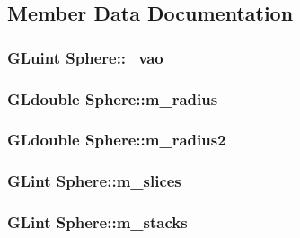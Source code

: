 \subsection{Member Data Documentation}
\hypertarget{class_sphere_a18d31b1d011d5c5e452b9b9b6f54b10f}{
\subsubsection[{\+\_\+vao}]{\setlength{\rightskip}{0pt plus 5cm}G\+Luint Sphere\+::\+\_\+vao\hspace{0.3cm}{\ttfamily [private]}}}\label{class_sphere_a18d31b1d011d5c5e452b9b9b6f54b10f}
\hypertarget{class_sphere_a4b019bb4bf74ac28ab56d5ae2c9ca6ea}{
\subsubsection[{m\+\_\+radius}]{\setlength{\rightskip}{0pt plus 5cm}G\+Ldouble Sphere\+::m\+\_\+radius\hspace{0.3cm}{\ttfamily [private]}}}\label{class_sphere_a4b019bb4bf74ac28ab56d5ae2c9ca6ea}
\hypertarget{class_sphere_aa3ec1c07df539131c0fb886fe9c619fd}{
\subsubsection[{m\+\_\+radius2}]{\setlength{\rightskip}{0pt plus 5cm}G\+Ldouble Sphere\+::m\+\_\+radius2\hspace{0.3cm}{\ttfamily [private]}}}\label{class_sphere_aa3ec1c07df539131c0fb886fe9c619fd}
\hypertarget{class_sphere_a6ddad99936fa616fa04862aa92e20105}{
\subsubsection[{m\+\_\+slices}]{\setlength{\rightskip}{0pt plus 5cm}G\+Lint Sphere\+::m\+\_\+slices\hspace{0.3cm}{\ttfamily [private]}}}\label{class_sphere_a6ddad99936fa616fa04862aa92e20105}
\hypertarget{class_sphere_aef79b7beb9d008e8dcc0849fbe691072}{
\subsubsection[{m\+\_\+stacks}]{\setlength{\rightskip}{0pt plus 5cm}G\+Lint Sphere\+::m\+\_\+stacks\hspace{0.3cm}{\ttfamily [private]}}}\label{class_sphere_aef79b7beb9d008e8dcc0849fbe691072}
